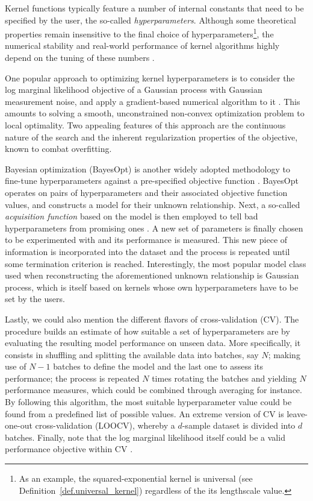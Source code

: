 Kernel functions typically feature a number of internal constants that need to be specified by the user, the so-called \textit{hyperparameters}. Although some theoretical properties remain insensitive to the final choice of hyperparameters\footnote{As an example, the squared-exponential kernel is universal (see Definition~\ref{def.universal_kernel}) regardless of the its lengthscale value.}, the numerical stability and real-world performance of kernel algorithms highly depend on the tuning of these numbers \citep{fasshauer2011positive}. 

One popular approach to optimizing kernel hyperparameters is to consider the log marginal likelihood objective of a Gaussian process with Gaussian measurement noise, and apply a gradient-based numerical algorithm to it \citep[§5.4.1]{williams2006gaussian}. This amounts to solving a smooth, unconstrained non-convex optimization problem to local optimality.  Two appealing features of this approach are the continuous nature of the search and the inherent regularization properties of the objective, known to combat overfitting. 

Bayesian optimization (BayesOpt) is another widely adopted methodology to fine-tune hyperparameters against a pre-specified objective function \citep{snoek2012practical,shahriari2015taking}. BayesOpt operates on pairs of hyperparameters and their associated objective function values, and constructs a model for their unknown relationship. Next, a so-called \textit{acquisition function} based on the model is then employed to tell bad hyperparameters from promising ones \citep{wilson2018maximizing}. A new set of parameters is finally chosen to be experimented with and its performance is measured. This new piece of information is incorporated into the dataset and the process is repeated until some termination criterion is reached. Interestingly, the most popular model class used when reconstructing the aforementioned unknown relationship is Gaussian process, which is itself based on kernels whose own hyperparameters have to be set by the users.

Lastly, we could also mention the different flavors of cross-validation (CV). The procedure builds an estimate of how suitable a set of hyperparameters are by evaluating the resulting model performance on unseen data. More specifically, it consists in shuffling and splitting the available data into batches, say $N$; making use of $N-1$ batches to define the model and the last one to assess its performance; the process is repeated $N$ times rotating the batches and yielding $N$ performance measures, which could be combined through averaging for instance. By following this algorithm, the most suitable hyperparameter value could be found from a predefined list of possible values. An extreme version of CV is leave-one-out cross-validation (LOOCV), whereby a $d$-sample dataset is divided into $d$ batches. Finally, note that the log marginal likelihood itself could be a valid performance objective within CV \citep[§5.4.2]{williams2006gaussian}.

